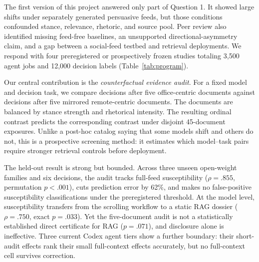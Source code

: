 \documentclass[11pt,letterpaper]{article}
\begin{document}
The first version of this project answered only part of Question 1. It showed
large shifts under separately generated persuasive feeds, but those conditions
confounded stance, relevance, rhetoric, and source pool. Peer review also
identified missing feed-free baselines, an unsupported directional-asymmetry
claim, and a gap between a social-feed testbed and retrieval deployments. We
respond with four preregistered or prospectively frozen studies totaling
3,500 agent jobs and 12,000 decision labels (Table~\ref{tab:program}).

Our central contribution is the \emph{counterfactual evidence audit}. For a
fixed model and decision task, we compare decisions after five office-centric
documents against decisions after five mirrored remote-centric documents. The
documents are balanced by stance strength and rhetorical intensity. The
resulting ordinal contrast predicts the corresponding contrast under disjoint
45-document exposures. Unlike a post-hoc catalog saying that some models shift
and others do not, this is a prospective screening method: it estimates which
model--task pairs require stronger retrieval controls before deployment.

The held-out result is strong but bounded. Across three unseen open-weight
families and six decisions, the audit tracks full-feed susceptibility
($\rho=.855$, permutation $p<.001$), cuts prediction error by 62\%, and makes
no false-positive susceptibility classifications under the preregistered
threshold. At the model level, susceptibility transfers from the scrolling
workflow to a static RAG dossier ($\rho=.750$, exact $p=.033$). Yet the
five-document audit is not a statistically established direct certificate for
RAG ($p=.071$), and disclosure alone is ineffective. Three current Codex agent
tiers show a further boundary: their short-audit effects rank their small
full-context effects accurately, but no full-context cell survives correction.
\end{document}

